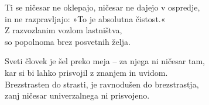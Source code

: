 Ti se ničesar ne oklepajo, ničesar ne dajejo v ospredje,\\
in ne razpravljajo: »To je absolutna čistost.«\\
Z razvozlanim vozlom lastništva,\\
so popolnoma brez posvetnih želja.

Sveti človek je šel preko meja -- za njega ni ničesar tam,\\
kar si bi lahko prisvojil z znanjem in uvidom.\\
Brezstrasten do strasti, je ravnodušen do brezstrastja,\\
zanj ničesar univerzalnega ni prisvojeno.

